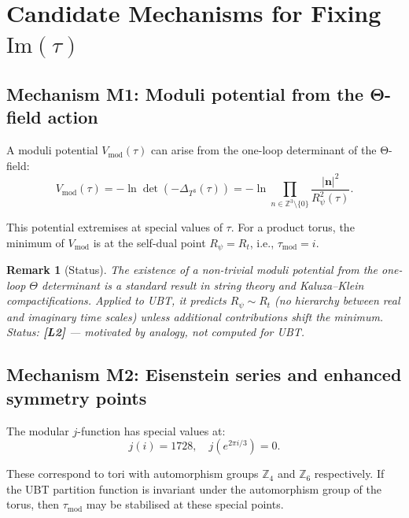 \documentclass[11pt,a4paper]{article}
\newtheorem{remark}{Remark}
\begin{document}
\section{Candidate Mechanisms for Fixing \texorpdfstring{$\mathrm{Im}(\tau)$}{Im(tau)}}
\label{sec:fix_tau}

\subsection{Mechanism M1: Moduli potential from the Θ-field action}

A moduli potential $V_{\mathrm{mod}}(\tau)$ can arise from the one-loop
determinant of the Θ-field:
\begin{equation}
\label{eq:moduli_potential}
  V_{\mathrm{mod}}(\tau)
  = -\ln\det(-\Delta_{T^3}(\tau))
  = -\ln\prod_{n\in\mathbb{Z}^3\setminus\{0\}}
    \frac{|\mathbf{n}|^2}{R_\psi^2(\tau)}.
\end{equation}

This potential extremises at special values of $\tau$.  For a product torus,
the minimum of $V_{\mathrm{mod}}$ is at the self-dual point $R_\psi = R_t$,
i.e., $\tau_{\mathrm{mod}} = i$.

\begin{remark}[Status]
  The existence of a non-trivial moduli potential from the one-loop $\Theta$
  determinant is a standard result in string theory and Kaluza--Klein
  compactifications.  Applied to UBT, it predicts $R_\psi \sim R_t$
  (no hierarchy between real and imaginary time scales) unless additional
  contributions shift the minimum.  Status: \textbf{[L2]} — motivated by
  analogy, not computed for UBT.
\end{remark}

\subsection{Mechanism M2: Eisenstein series and enhanced symmetry points}

The modular $j$-function has special values at:
\begin{equation}
  j(i) = 1728, \quad j(e^{2\pi i/3}) = 0.
\end{equation}

These correspond to tori with automorphism groups $\mathbb{Z}_4$ and
$\mathbb{Z}_6$ respectively.  If the UBT partition function is invariant
under the automorphism group of the torus, then $\tau_{\mathrm{mod}}$
may be stabilised at these special points.
\end{document}
